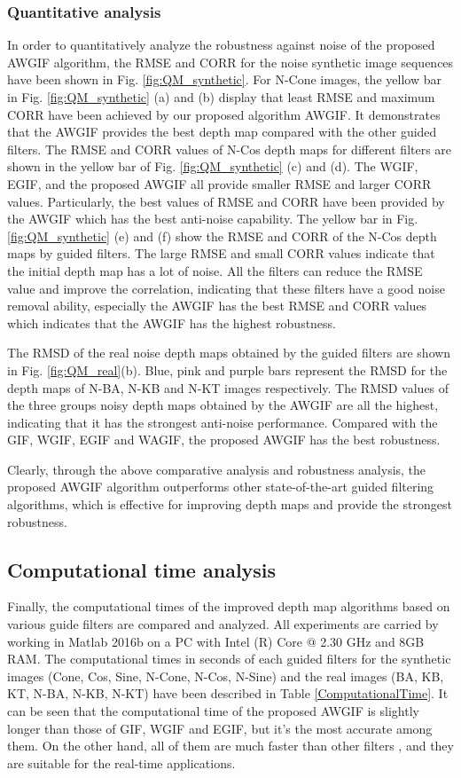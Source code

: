 \documentclass[a4paper,fleqn]{cas-dc}
\begin{document}
\subsubsection{Quantitative analysis}\label{QuantitativeRo}
In order to quantitatively analyze the robustness against noise of the proposed AWGIF algorithm, the RMSE and CORR for the noise synthetic image sequences have been shown in Fig. \ref{fig:QM_synthetic}. For N-Cone images, the yellow bar in Fig. \ref{fig:QM_synthetic} (a) and (b) display that least RMSE and maximum CORR have been achieved by our proposed algorithm AWGIF. It demonstrates that the AWGIF provides the best depth map compared with the other guided filters. The RMSE and CORR values of N-Cos depth maps for different filters are shown in the yellow bar of Fig. \ref{fig:QM_synthetic} (c) and (d). The WGIF, EGIF, and the proposed AWGIF all provide smaller RMSE and larger CORR values. Particularly, the best values of RMSE and CORR have been provided by the AWGIF which has the best anti-noise capability. The yellow bar in Fig. \ref{fig:QM_synthetic} (e) and (f) show the RMSE and CORR of the N-Cos depth maps by guided filters. The large RMSE and small CORR values indicate that the initial depth map has a lot of noise. All the filters can reduce the RMSE value and improve the correlation, indicating that these filters have a good noise removal ability, especially the AWGIF has the best RMSE and CORR values which indicates that the AWGIF has the highest robustness. 

The RMSD of the real noise depth maps obtained by the guided filters are shown in Fig. \ref{fig:QM_real}(b). Blue, pink and purple bars represent the RMSD for the depth maps of N-BA, N-KB and N-KT images respectively. The RMSD values of the three groups noisy depth maps obtained by the AWGIF are all the highest, indicating that it has the strongest anti-noise performance. Compared with the GIF, WGIF, EGIF and WAGIF, the proposed AWGIF has the best robustness.

Clearly, through the above comparative analysis and robustness analysis, the proposed AWGIF algorithm outperforms other state-of-the-art guided filtering algorithms, which is effective for improving depth maps and provide the strongest robustness.

\subsection{Computational time analysis}\label{Computation}
Finally, the computational times of the improved depth map algorithms based on various guide filters are compared and analyzed. All experiments are carried by working in Matlab 2016b on a PC with Intel (R) Core @ 2.30 GHz and 8GB RAM. The computational times in seconds of each guided filters for the synthetic images (Cone, Cos, Sine, N-Cone, N-Cos, N-Sine) and the real images (BA, KB, KT, N-BA, N-KB, N-KT) have been described in Table \ref{ComputationalTime}. It can be seen that the computational time of the proposed AWGIF is slightly longer than those of GIF, WGIF and EGIF, but it's the most accurate among them. On the other hand, all of them are much faster than other filters \cite{ali2021guided}, and they are suitable for the real-time applications.
\end{document}
